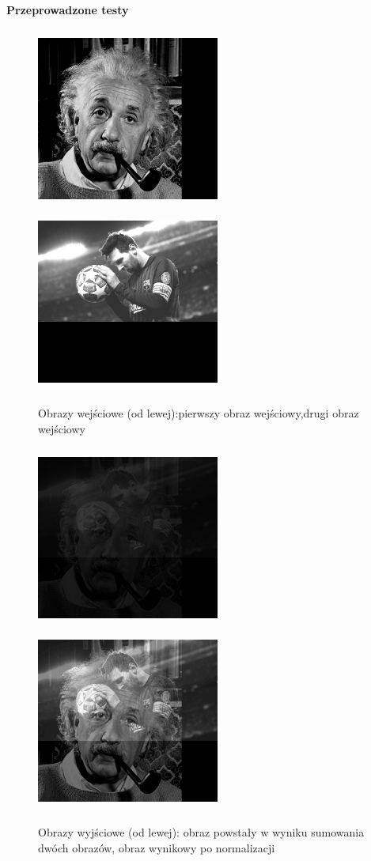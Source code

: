\documentclass[magisterska,openany]{pracadypl}
\begin{document}
\newpage
\vspace{0.25cm}\textbf{\Large Przeprowadzone testy}
\vspace{0.5cm}
\begin{figure}[h]
\centering
\includegraphics[width=6cm, height=6cm]{2_2/ResolG1.jpg}
\includegraphics[width=6cm, height=6cm]{2_2/ResolG2.jpg}
\caption{Obrazy wejściowe (od lewej):pierwszy obraz wejściowy,drugi obraz wejściowy}
\end{figure}
\begin{figure}[h]
\centering
\includegraphics[width=6cm, height=6cm]{3_2/add_twoG1.jpg}
\includegraphics[width=6cm, height=6cm]{3_2/nadd_twoG1.jpg}
\caption{Obrazy wyjściowe (od lewej): obraz powstały w wyniku sumowania dwóch obrazów, obraz wynikowy po normalizacji}
\end{figure}
\end{document}
